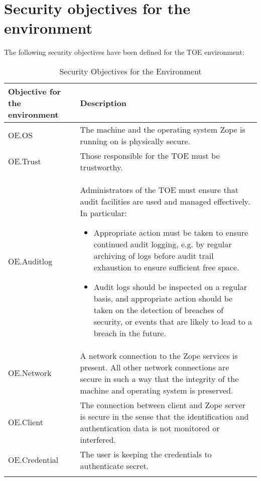 \documentclass[12pt,english]{scrbook}
\begin{document}



\section{Security objectives for the environment}

The following security objectives have been defined for the TOE environment:

\begin{longtable}[c]{lp{10cm}}
  \toprule
   Objective for the environment & Description \\
  
  \midrule\endhead

  OE.OS
   & 
  The machine and the operating system Zope is running
  on is physically secure.
   \\

  OE.Trust
   & 
  Those responsible for the TOE must be trustworthy.
   \\

  OE.Auditlog
   & 
  Administrators of the TOE must ensure that audit
  facilities are used and managed effectively. In
  particular:

  \begin{itemize}
  
    \item Appropriate action must be taken to ensure continued audit logging,
    e.g. by regular archiving of logs before audit trail exhaustion to ensure
    sufficient free space.

    \item Audit logs should be inspected on a regular basis, and appropriate
    action should be taken on the detection of breaches of security, or events
    that are likely to lead to a breach in the future.

  \end{itemize}
   \\

  OE.Network
   & 
  A network connection to the Zope services is present.
  All other network connections are secure in such a
  way that the integrity of the machine and operating
  system is preserved.
   \\

  OE.Client
   & 
  The connection between client and Zope server is secure
  in the sense that the identification and authentication
  data is not monitored or interfered.
   \\

  OE.Credential
   & 
  The user is keeping the credentials to authenticate
  secret.
  \\
  \bottomrule
  \caption{Security Objectives for the Environment}
\end{longtable}
\end{document}

